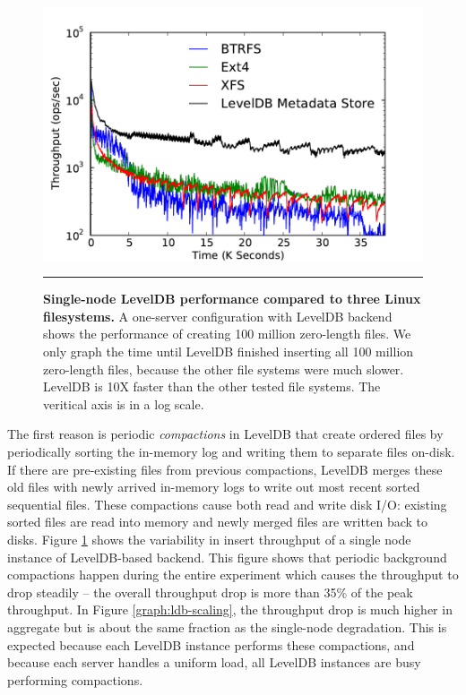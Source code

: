 \begin{figure}[t]  %
\centerline{\includegraphics[scale=0.45]{./figs/ldb_insertrate_onenode}}
\caption{
\textbf{Single-node LevelDB performance compared to three Linux filesystems.}
{\small
A one-server configuration with LevelDB backend shows the performance of creating 100 million zero-length files.
We only graph the time until LevelDB finished inserting all 100 million zero-length files, 
because the other file systems were much slower. LevelDB is 10X faster than the other tested file systems.
The veritical axis is in a log scale.
}
}
\vspace{15pt}
\hrule 
\label{graph:ldb-singlenode}
\end{figure}       %

The first reason is periodic \textit{compactions} in LevelDB that create
ordered files 
by periodically sorting the in-memory log and writing them to separate files 
on-disk. If there are pre-existing files from previous compactions, LevelDB merges 
these old files with newly arrived in-memory logs to write out most recent sorted 
sequential files. These compactions cause both read and write disk I/O:
existing sorted files are read into memory and newly merged files are written
back to disks. Figure \ref{graph:ldb-singlenode} shows the variability in insert
throughput of a single node instance of LevelDB-based backend. This figure
shows that periodic background compactions happen during the entire experiment
which causes the throughput to drop steadily -- the overall throughput drop is
more than 35\% of the peak throughput.
In Figure \ref{graph:ldb-scaling}, the throughput drop is much higher in
aggregate but is about the same fraction as the single-node degradation.
This is expected because each LevelDB instance performs these compactions, and 
because each \giga{} server handles a uniform load, all LevelDB instances are busy
performing compactions.  

